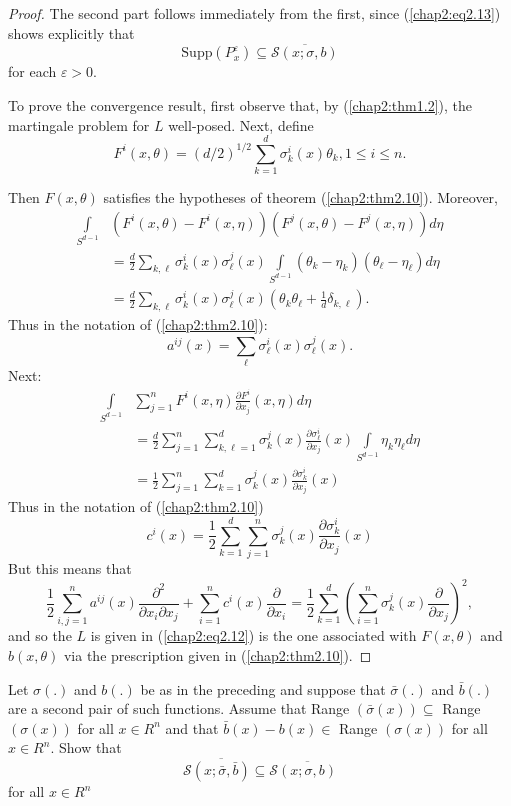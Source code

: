 \begin{proof}
The second part follows immediately from the first, since (\ref{chap2:eq2.13})
shows explicitly that 
$$
\text{Supp}(P^\varepsilon_x) \subseteq \overline{\mathscr{S} (x; \sigma , b)}  
$$
for each $\varepsilon > 0$.

To prove the convergence result, first observe that, by
(\ref{chap2:thm1.2}), the 
martingale problem for $L$ well-posed. Next, define 
$$
F^i(x, \theta) = (d/2)^{1/2} \sum^d_{k=1} \sigma^i_k (x)\theta_k, 1
\le i \le n. 
$$

Then $F(x, \theta)$ satisfies the hypotheses of theorem
(\ref{chap2:thm2.10}). Moreover,  
\begin{align*}
\int\limits_{S^{d-1}} & (F^i(x, \theta) - F^i(x, \eta)) (F^j(x, \theta) -
F^j(x, \eta)) d\eta \\
& = \frac{d}{2} \sum_{k, \ell} \sigma^i_k (x)
\sigma^j_{\ell}(x)\int\limits_{S^{d-1}} (\theta_k   - \eta_k)
(\theta_\ell - \eta_\ell) d\eta \\  
& = \frac{d}{2} \sum_{k, \ell} \sigma^i_k (x)
\sigma^j_{\ell}(x)(\theta_k \theta_\ell +   \frac{1}{d}
\delta_{k,\ell}).  
\end{align*}
Thus in the notation of (\ref{chap2:thm2.10}):
$$
a^{ij}(x) = \sum_{\ell} \sigma^i_\ell (x)\sigma^j_\ell (x).
$$
Next:\pageoriginale
\begin{align*}
\int\limits_{S^{d-1}} & \sum^n_{j=1} F^i(x, \eta) \frac{\partial
  F^i}{\partial x_j} (x, \eta) d\eta \\
& = \frac{d}{2} \sum^n_{j=1} \sum^d_{k, \ell=1} \sigma^j_k (x)
  \frac{\partial \sigma^i_\ell}{\partial x_j} (x) \int\limits_{S^{d-1}} \eta_k
  \eta_\ell d\eta \\ 
& = \frac{1}{2} \sum^n_{j=1} \sum^d_{k=1} \sigma^j_k (x)
  \frac{\partial \sigma^i_k}{\partial x_j} (x) 
\end{align*}
Thus in the notation of (\ref{chap2:thm2.10})
$$
c^i(x) = \frac{1}{2} \sum^d_{k=1} \sum^n_{j=1} \sigma^j_k (x)
\frac{\partial \sigma^i_k}{\partial x_j} (x) 
$$
But this means that 
$$
\frac{1}{2} \sum^n_{i,j=1} a^{ij}(x)\frac{\partial^2}{\partial x_i
  \partial x_j} + \sum^n_{i=1} c^i(x) \frac{\partial}{\partial x_i} =
\frac{1}{2} \sum^d_{k=1} (\sum^n_{i=1} \sigma^j_k (x)
\frac{\partial}{\partial x_j})^2, 
$$
and so the $L$ is given in (\ref{chap2:eq2.12}) is the one associated with $F(x,
\theta)$ and $b(x, \theta)$ via the prescription given in
(\ref{chap2:thm2.10}).  
\end{proof}

\setcounter{exercise}{14}
\begin{exercise}%
 Let $\sigma (.)$ and $b(.)$ be as in the preceding and suppose that
 $\bar{\sigma}(.)$ and $\bar{b}(.)$ are a second pair of such
 functions. Assume that Range $(\bar{\sigma}(x)) \subseteq$ Range
 $(\sigma(x))$ for all $x \in R^n$ and that $\bar{b}(x) - b(x)
 \in$ Range $(\sigma(x))$ for all $x \in R^n$. Show
 that 
$$
\mathscr{S} \overline{(x ; \bar{\sigma}, \bar{b})} \subseteq
\mathscr{S} \overline {(x; \sigma, b)} 
$$
for all $x \in R^n$
 \end{exercise}

